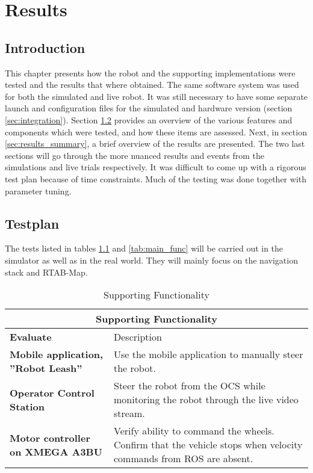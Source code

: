 \chapter{Results}
\label{chp:results} 

\section{Introduction}

This chapter presents how the robot and the supporting implementations were tested and the results that where obtained. The same software system was used for both the simulated and live robot. It was still necessary to have some separate launch and configuration files for the simulated and hardware version (section \ref{sec:integration}). Section \ref{sec:testplan} provides an overview of the various features and components which were tested, and how these items are assessed. Next, in section \ref{sec:results_summary}, a brief overview of the results are presented. The two last sections will go through the more nuanced results and events from the simulations and live trials respectively. It was difficult to come up with a rigorous test plan because of time constraints. Much of the testing was done together with parameter tuning. 


\section{Testplan}
\label{sec:testplan}
The tests listed in tables \ref{tab:support_func} and \ref{tab:main_func} will be carried out in the simulator as well as in the real world. They will mainly focus on the navigation stack and \ac{RTAB-Map}. 

\begin{table}
	\centering
	\begin{tabular}{ p{3.5cm} | p{7cm} }
		\multicolumn{2}{c}{Supporting Functionality}\\
		\hline
		\textbf{Evaluate} & Description\\
		\hline
		\textbf{Mobile application, ''Robot Leash''} & Use the mobile application to manually steer the robot.\\
		\hline
		\textbf{Operator Control Station} & Steer the robot from the \ac{OCS} while monitoring the robot through the live video stream. \\
		\hline
		\textbf{Motor controller on XMEGA A3BU} & Verify ability to command the wheels. Confirm that the vehicle stops when velocity commands from \ac{ROS} are absent.\\
		\hline
	\end{tabular}
	\caption{Supporting Functionality}\label{tab:support_func}
\end{table}

